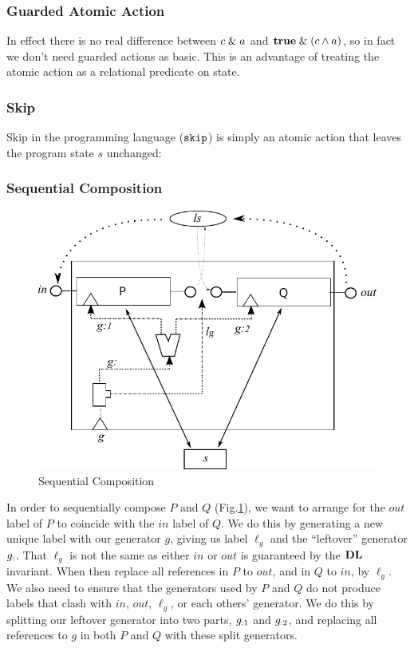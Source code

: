 \subsubsection{Guarded Atomic Action}
In effect there is no real difference between $c \mathrel{\&} a$
and $\mathbf{true} \mathrel{\&} (c \land a)$,
so in fact we don't need guarded actions as basic.
This is an advantage of treating the atomic action as a relational predicate
on state.


\subsubsection{Skip}

Skip in the programming language ($\texttt{skip}$)
is simply an atomic action that leaves the program state $s$ unchanged:

\subsubsection{Sequential Composition}

\begin{figure}[h]
  \centering
  \includegraphics[scale=0.85]{images/seq-comp-actual}
  \caption{Sequential Composition}
  \label{fig:seq-comp}
\end{figure}

In order to sequentially compose $P$ and $Q$ (Fig.\ref{fig:seq-comp}),
we want to arrange for the $out$ label of $P$
to coincide with the $in$ label of $Q$.
We do this by generating a new unique label with our generator $g$,
giving us label $\ell_g$ and the ``leftover'' generator $g_{:}$.
That $\ell_g$ is not the same as either $in$ or $out$
is guaranteed by the $\mathbf{DL}$ invariant.
When then replace all references in $P$ to $out$,
and in $Q$ to $in$, by $\ell_g$.
We also need to ensure that the generators used by $P$ and $Q$
do not produce labels that clash with $in$, $out$, $\ell_g$,
or each others' generator.
We do this by splitting our leftover generator into two parts,
$g_{:1}$ and $g_{:2}$,
and replacing all references to $g$ in both $P$ and $Q$
with these split generators.

